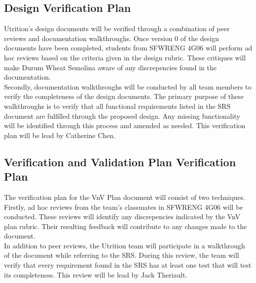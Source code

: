 \documentclass[12pt, titlepage]{article}
\begin{document}
	\subsection{Design Verification Plan}
	
	
	
	
	Utrition's design documents will be verified through a combination of peer reviews and documentation walkthroughs. Once version 0 of the design documents have been completed, students from SFWRENG 4G06 will perform ad hoc reviews based on the criteria given in the design rubric. These critiques will make Durum Wheat Semolina aware of any discrepencies found in the documentation.\\
	
	Secondly, documentation walkthroughs will be conducted by all team members to verify the completeness of the design documents. The primary purpose of these walkthroughs is to verify that all functional requirements listed in the SRS document are fulfilled through the proposed design. Any missing functionality will be identified through this process and amended as needed. This verification plan will be lead by Catherine Chen.
	
	\subsection{Verification and Validation Plan Verification Plan}
	
	
	
	
	The verification plan for the VnV Plan document will consist of two techniques. Firstly, ad hoc reviews from the team's classmates in SFWRENG 4G06 will be conducted. These reviews will identify any discrepencies indicated by the VnV plan rubric. Their resulting feedback will contribute to any changes made to the document.\\
	
	In addition to peer reviews, the Utrition team will participate in a walkthrough of the document while referring to the SRS. During this review, the team will verify that every requirement found in the SRS has at least one test that will test its completeness. This review will be lead by Jack Theriault. 
	
\end{document}

